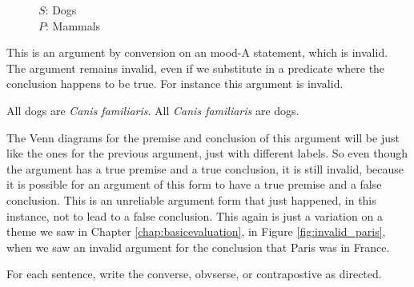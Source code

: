 \begin{figure}[H]
\begin{center}
\end{center}
\captionsetup{singlelinecheck=on}
\caption*{$S$: Dogs \\ $P$: Mammals}
\end{figure}

This is an argument by conversion on an mood-A statement, which is invalid. The argument remains invalid, even if we substitute in a predicate where the conclusion happens to be true. For instance this argument is invalid.

\begin{earg*}
\item  All dogs are \textit{Canis familiaris}.
\itemc[.4] All \textit{Canis familiaris} are dogs.
\end{earg*}

The Venn diagrams for the premise and conclusion of this argument will be just like the ones for the previous argument, just with different labels. So even though the argument has a true premise and a true conclusion, it is still invalid, because it is possible for an argument of this form to have a true premise and a false conclusion. This is an unreliable argument form that just happened, in this instance, not to lead to a false conclusion. This again is just a variation on a theme we saw in Chapter \ref{chap:basicevaluation}, in Figure \ref{fig:invalid_paris}, when we saw an invalid argument for the conclusion that Paris was in France.



\practiceproblems

\noindent \problempart For each sentence, write the converse, obvserse, or contrapostive as directed.

